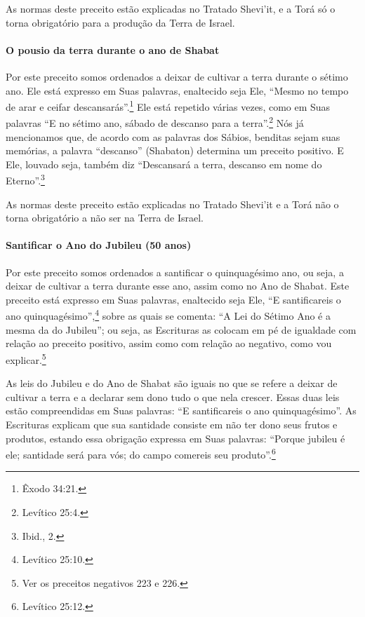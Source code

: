 \begin{multicols}{2}
As normas deste preceito estão explicadas no Tratado Shevi'it\starr, e a Torá\starr{}
só o torna obrigatório para a produção da Terra de Israel.

\paragraph{O pousio da terra durante o ano de Shabat}

Por este preceito somos ordenados a deixar de cultivar a terra durante
o sétimo ano. Ele está expresso em Suas palavras, enaltecido seja Ele,
``Mesmo no tempo de arar e ceifar descansarás''.\footnote{Êxodo 34:21.} Ele está
repetido várias vezes, como em Suas palavras ``E no sétimo ano, sábado
de descanso para a terra''.\footnote{Levítico 25:4.} Nós já mencionamos que, de
acordo com as palavras dos Sábios, benditas sejam suas memórias, a
palavra ``descanso'' (Shabaton) determina um preceito positivo. E Ele,
louvado seja, também diz ``Descansará a terra, descanso em nome do
Eterno''.\footnote{Ibid., 2.}

As normas deste preceito estão explicadas no Tratado Shevi'it\starr{} e a Torá\starr{}
não o torna obrigatório a não ser na Terra de Israel.

\paragraph{Santificar o Ano do Jubileu (50 anos)}

Por este preceito somos ordenados a santificar o quinquagésimo ano, ou
seja, a deixar de cultivar a terra durante esse ano, assim como no Ano
de Shabat. Este preceito está expresso em Suas palavras, enaltecido seja
Ele, ``E santificareis o ano quinquagésimo'',\footnote{Levítico 25:10.} sobre as
quais se comenta: ``A Lei do Sétimo Ano é a mesma da do Jubileu''; ou
seja, as Escrituras as colocam em pé de igualdade com relação ao preceito positivo, assim como com relação ao negativo, como vou explicar.\footnote{Ver os preceitos negativos 223 e 226.}

As leis do Jubileu e do Ano de Shabat são iguais no que se refere a
deixar de cultivar a terra e a declarar sem dono tudo o que nela crescer. Essas
duas leis estão compreendidas em Suas palavras: ``E santificareis o ano
quinquagésimo''. As Escrituras explicam que sua santidade consiste em
não ter dono seus frutos e produtos, estando essa obrigação expressa em
Suas palavras: ``Porque jubileu é ele; santidade será para vós; do
campo comereis seu produto''.\footnote{Levítico 25:12.}


\end{multicols}
